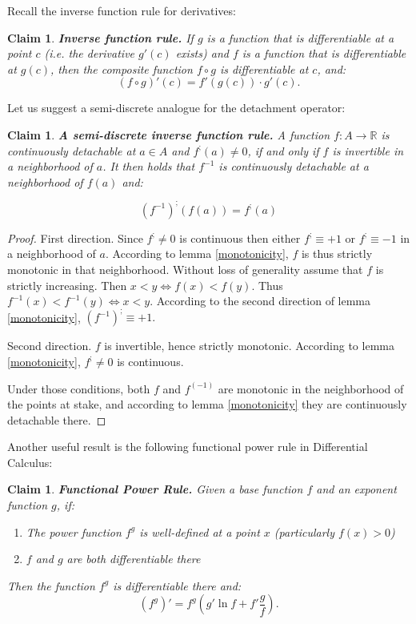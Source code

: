 \documentclass[11pt]{book}
\newtheorem{clm}[thm]{Claim}
\begin{document}
Recall the inverse function rule for derivatives:

\begin{clm}\textbf{Inverse function rule. }If $g$ is a function that is differentiable at a point $c$ (i.e. the derivative $g'\left(c\right)$ exists) and $f$ is a function that is differentiable at $g\left(c\right)$, then the composite function $f\circ g$ is differentiable at $c$, and:
$$\left(f\circ g\right)'\left(c\right)=f'\left(g\left(c\right)\right)\cdot g'\left(c\right).$$
\label{inverse_function_rule_derivative}
\end{clm}

Let us suggest a semi-discrete analogue for the detachment operator:
\begin{clm}\textbf{A semi-discrete inverse function rule.} A function $f:A\rightarrow \mathbb{R}$ is continuously detachable at $a\in A$ and $f^{;} \left(a\right)\neq0$, if and only if $f$ is invertible in a neighborhood of $a$. It then holds that $f^{-1}$ is continuously detachable at a neighborhood of $f\left(a\right)$ and:

$$\left(f^{-1}\right)^{;}\left(f\left(a\right)\right)=f^{;}\left(a\right)$$
\label{inverse_function_rule_detachment}
\end{clm}
\begin{proof}First direction. Since $f^{;}\neq0$ is continuous then either $f^{;}\equiv+1$ or $f^{;}\equiv-1$ in a neighborhood of $a.$ According to lemma \ref{monotonicity}, $f$ is thus strictly monotonic in that neighborhood. Without loss of generality assume that $f$ is strictly increasing. Then $x < y\Longleftrightarrow f\left(x\right) < f\left(y\right).$ Thus $f^{-1}\left(x\right) < f^{-1}\left(y\right)\Longleftrightarrow x < y.$ According to the second direction of lemma \ref{monotonicity}, $\left(f^{-1}\right)^{;}\equiv+1.$

Second direction. $f$ is invertible, hence strictly monotonic. According to lemma \ref{monotonicity}, $f^{;}\neq 0$ is continuous.

Under those conditions, both $f$ and $f^{\left(-1\right)}$ are monotonic in the neighborhood of the points at stake, and according to lemma \ref{monotonicity} they are continuously detachable there.
\end{proof}

Another useful result is the following functional power rule in Differential Calculus:
\begin{clm}\textbf{Functional Power Rule. }Given a base function $f$ and an exponent function $g$, if:
\begin{enumerate}
\item The power function $f^{g}$ is well-defined at a point $x$ (particularly $f\left(x\right)>0$)
\item $f$ and $g$ are both differentiable there
\end{enumerate}
Then the function $f^{g}$ is differentiable there and:
$$\left(f^{g}\right)'=f^{g}\left(g'\ln f+f'\frac{g}{f}\right).$$
\label{functional_power_rule_derivative}
\end{clm}
\end{document}

